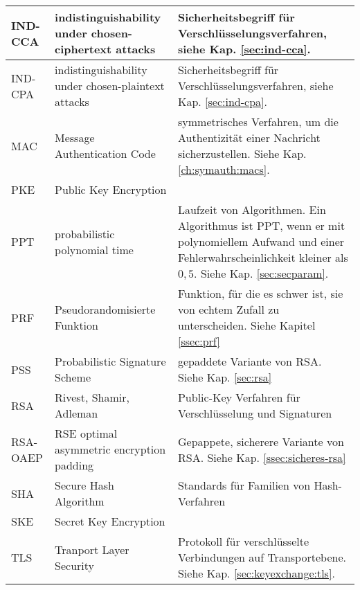 \begin{tabular}{p{} | p{} | p{}}
  IND-CCA     & indistinguishability under chosen-ciphertext attacks       & Sicherheitsbegriff für Verschlüsselungsverfahren, siehe Kap. \ref{sec:ind-cca}. \\ \hline
  IND-CPA     & indistinguishability under chosen-plaintext attacks        & Sicherheitsbegriff für Verschlüsselungsverfahren, siehe Kap. \ref{sec:ind-cpa}. \\ \hline
  MAC         & Message Authentication Code                                & symmetrisches Verfahren, um die Authentizität einer Nachricht                                   
                                                                             sicherzustellen. Siehe Kap. \ref{ch:symauth:macs}.               \\ \hline
  PKE & Public Key Encryption & \\ \hline
  PPT         & probabilistic polynomial time                              & Laufzeit von Algorithmen. Ein Algorithmus ist PPT, wenn er mit polynomiellem Aufwand und        
                                                                      einer  Fehlerwahrscheinlichkeit kleiner als $0,5$. Siehe Kap. \ref{sec:secparam}. \\ \hline 
  PRF         & Pseudorandomisierte Funktion                               & Funktion, für die es schwer ist, sie von echtem Zufall zu                                       
                                       unterscheiden. Siehe Kapitel \ref{ssec:prf}                      \\ \hline
  PSS         & Probabilistic Signature Scheme                             & gepaddete Variante von RSA. Siehe Kap. \ref{sec:rsa}             \\ \hline
  RSA         & Rivest, Shamir, Adleman                                    & Public-Key Verfahren für Verschlüsselung und Signaturen          \\ \hline
  RSA-OAEP    & RSE optimal asymmetric encryption padding                  & Gepappete, sicherere Variante von RSA. Siehe Kap. \ref{ssec:sicheres-rsa}  \\ \hline
  SHA         & Secure Hash Algorithm                                      & Standards für Familien von Hash-Verfahren                        \\ \hline
  SKE & Secret Key Encryption & \\ \hline
  TLS         & Tranport Layer Security                                    & Protokoll für verschlüsselte Verbindungen auf Transportebene.                                   
                                                                             Siehe Kap. \ref{sec:keyexchange:tls}.                            \\ \hline
\end{tabular}
